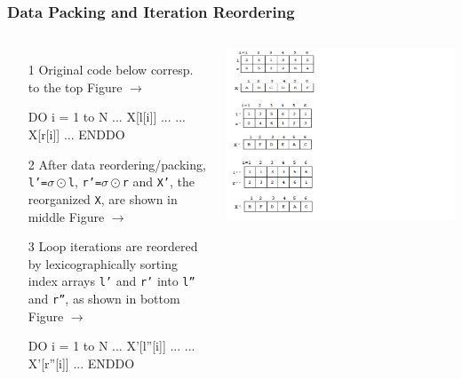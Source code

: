 \documentclass{beamer}
\begin{document}
\begin{frame}[fragile,t]
  \frametitle{Data Packing and Iteration Reordering}

\begin{columns}
\begin{itemize}
\item[1] Original code below corresp.\\
to the top Figure $\rightarrow$
\begin{colorcode}
DO i = 1 to N
  ... X[l[i]] ...
  ... X[r[i]] ...
ENDDO
\end{colorcode}
\smallskip

\item[2] After data reordering/packing, {\tt l'=$\sigma\odot$l},
{\tt r'=$\sigma\odot$r} and {\tt X'}, the reorganized {\tt X},
are shown in middle Figure $\rightarrow$\smallskip

\item[3] Loop iterations are reordered
        by lexicographically sorting index arrays
        {\tt l'} and {\tt r'} into {\tt l''} and {\tt r''},
        as shown in bottom Figure $\rightarrow$
\begin{colorcode}
DO i = 1 to N
  ... X'[l''[i]] ...
  ... X'[r''[i]] ...
ENDDO
\end{colorcode}
\end{itemize}
\includegraphics[width=59ex]{Figures/RedorderingDaIt}
\end{columns}

 
\end{frame}
\end{document}
